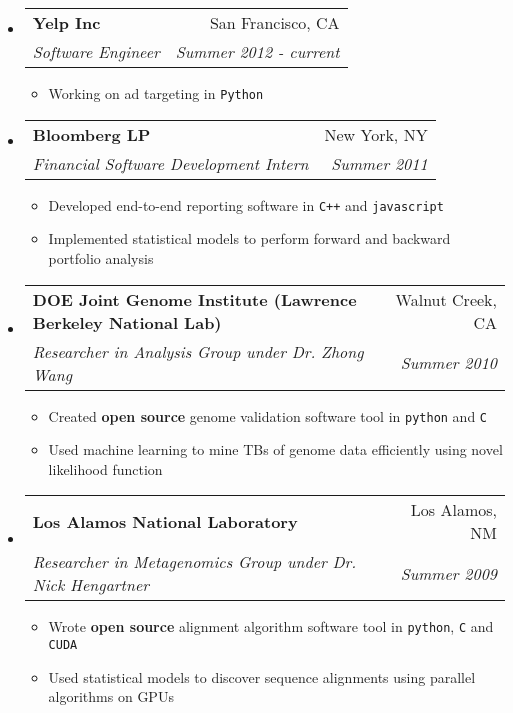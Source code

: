 \documentclass[letterpaper,11pt]{article}
\makeatletter
\newcommand{\resitem}[1]{\item #1 \vspace{-2pt}}
\newcommand{\ressubheading}[4]{

\begin{tabular*}{6.5in}{l@{\cftdotfill{\cftsecdotsep}\extracolsep{\fill}}r}

		\textbf{#1} & #2 \\

		\textit{#3} & \textit{#4} \\

\end{tabular*}\vspace{-6pt}}
\makeatother
\begin{document}
\begin{itemize}

\item

	\ressubheading{Yelp Inc}{San Francisco, CA}{Software Engineer}{Summer 2012 - current}

	\begin{itemize}

		\resitem{Working on ad targeting in \texttt{Python}}

	\end{itemize}

\item

	\ressubheading{Bloomberg LP}{New York, NY}{Financial Software Development Intern}{Summer 2011}

	\begin{itemize}

		\resitem{Developed end-to-end reporting software in \texttt{C++} and \texttt{javascript}}

    \resitem{Implemented statistical models to perform forward and backward portfolio analysis}

	\end{itemize}

\item

	\ressubheading{DOE Joint Genome Institute (Lawrence Berkeley National Lab)}{Walnut Creek, CA}{Researcher in Analysis Group under Dr. Zhong Wang}{Summer 2010}

	\begin{itemize}

		\resitem{Created \textbf{open source} genome validation software tool in \texttt{python} and \texttt{C}}

    \resitem{Used machine learning to mine TBs of genome data efficiently using novel likelihood function}

	\end{itemize}

\item 

	\ressubheading{Los Alamos National Laboratory}{Los Alamos, NM}{Researcher in Metagenomics Group under Dr. Nick Hengartner}{Summer 2009}

	\begin{itemize}

		\resitem{Wrote \textbf{open source} alignment algorithm software tool in \texttt{python}, \texttt{C} and \texttt{CUDA}}

    \resitem{Used statistical models to discover sequence alignments using parallel algorithms on GPUs}


\end{itemize}
\end{itemize}
\end{document}
